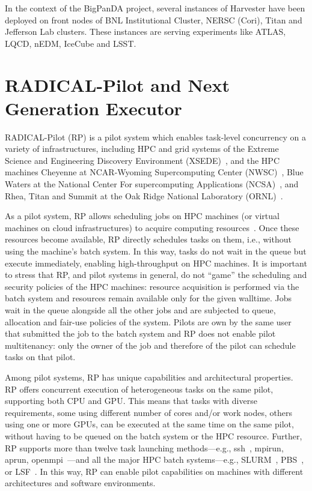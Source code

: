\documentclass{webofc}
\begin{document}
In the context of the BigPanDA project, several instances of Harvester have
been deployed on front nodes of BNL Institutional Cluster, NERSC (Cori),
Titan and Jefferson Lab clusters. These instances are serving experiments
like ATLAS, LQCD, nEDM, IceCube and LSST.


\section{RADICAL-Pilot and Next Generation Executor}\label{sec:rp}

RADICAL-Pilot (RP) is a pilot system which enables task-level concurrency on
a variety of infrastructures, including HPC and grid systems of the Extreme
Science and Engineering Discovery Environment (XSEDE)~\cite{towns2014xsede},
and the HPC machines Cheyenne at NCAR-Wyoming Supercomputing Center
(NWSC)~\cite{cheyenne}, Blue Waters at the National Center For supercomputing
Applications (NCSA)~\cite{bluewaters}, and Rhea, Titan and Summit at the Oak
Ridge National Laboratory (ORNL)~\cite{olcf-resources}.

As a pilot system, RP allows scheduling jobs on HPC machines (or virtual
machines on cloud infrastructures) to acquire computing
resources~\cite{turilli2018comprehensive}. Once these resources become
available, RP directly schedules tasks on them, i.e., without using the
machine’s batch system. In this way, tasks do not wait in the queue but
execute immediately, enabling high-throughput on HPC machines. It is
important to stress that RP, and pilot systems in general, do not ``game''
the scheduling and security policies of the HPC machines: resource
acquisition is performed via the batch system and resources remain available
only for the given walltime. Jobs wait in the queue alongside all the other
jobs and are subjected to queue, allocation and fair-use policies of the
system. Pilots are own by the same user that submitted the job to the batch
system and RP does not enable pilot multitenancy: only the owner of the job
and therefore of the pilot can schedule tasks on that pilot.
	
Among pilot systems, RP has unique capabilities and architectural properties.
RP offers concurrent execution of heterogeneous tasks on the same pilot,
supporting both CPU and GPU. This means that tasks with diverse requirements,
some using different number of cores and/or work nodes, others using one or
more GPUs, can be executed at the same time on the same pilot, without having
to be queued on the batch system or the HPC resource. Further, RP supports
more than twelve task launching methods---e.g., ssh~\cite{ssh}, mpirun,
aprun, openmpi~\cite{gropp1999using}---and all the major HPC batch
systems---e.g., SLURM~\cite{yoo2003slurm}, PBS~\cite{henderson1995job}, or
LSF~\cite{zhou1992lsf}. In this way, RP can enable pilot capabilities on
machines with different architectures and software environments.
\end{document}
